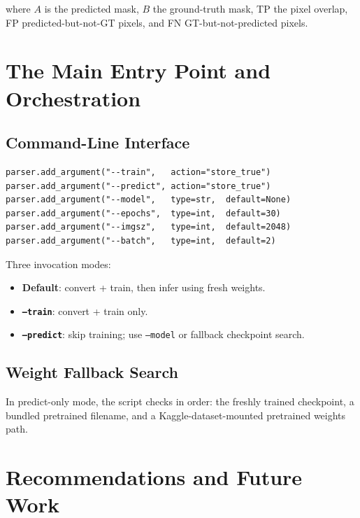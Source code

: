 \documentclass[11pt,a4paper,openany]{report}
\begin{document}
where $A$ is the predicted mask, $B$ the ground-truth mask, TP the pixel overlap, FP
predicted-but-not-GT pixels, and FN GT-but-not-predicted pixels.

\chapter{The Main Entry Point and Orchestration}

\section{Command-Line Interface}

\begin{lstlisting}[caption={Argument parsing},label={lst:args}]
parser.add_argument("--train",   action="store_true")
parser.add_argument("--predict", action="store_true")
parser.add_argument("--model",   type=str,  default=None)
parser.add_argument("--epochs",  type=int,  default=30)
parser.add_argument("--imgsz",   type=int,  default=2048)
parser.add_argument("--batch",   type=int,  default=2)
\end{lstlisting}

Three invocation modes:
\begin{itemize}
  \item \textbf{Default}: convert + train, then infer using fresh weights.
  \item \textbf{\texttt{--train}}: convert + train only.
  \item \textbf{\texttt{--predict}}: skip training; use \texttt{--model} or fallback checkpoint search.
\end{itemize}

\section{Weight Fallback Search}

In predict-only mode, the script checks in order: the freshly trained checkpoint, a bundled
pretrained filename, and a Kaggle-dataset-mounted pretrained weights path.

\chapter{Recommendations and Future Work}
\end{document}
